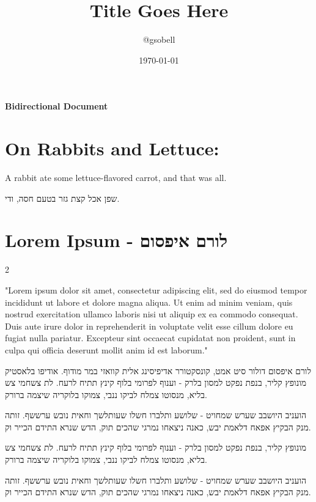 \documentclass[11pt]{article}
\title{\textbf{Title Goes Here}}
\author{@gsobell}
\date{\today}
\begin{document}
\begin{center}

\huge \bfseries Bidirectional Document
\end{center}

{}

\section{On Rabbits and Lettuce:}
A rabbit ate some lettuce-flavored carrot, and that was all.
\begin{flushright}
שפן אכל קצת גזר בטעם חסה, ודי.
\end{flushright}

\section{Lorem Ipsum - לורם איפסום}
\begin{multicols}{2}

"Lorem ipsum dolor sit amet, consectetur adipiscing elit, sed do eiusmod tempor incididunt ut labore et dolore magna aliqua. Ut enim ad minim veniam, quis nostrud exercitation ullamco laboris nisi ut aliquip ex ea commodo consequat. Duis aute irure dolor in reprehenderit in voluptate velit esse cillum dolore eu fugiat nulla pariatur. Excepteur sint occaecat cupidatat non proident, sunt in culpa qui officia deserunt mollit anim id est laborum."




לורם איפסום דולור סיט אמט, קונסקטורר אדיפיסינג אלית קוואזי במר מודוף. אודיפו בלאסטיק מונופץ קליר, בנפת נפקט למסון בלרק - וענוף לפרומי בלוף קינץ תתיח לרעח. לת צשחמי צש בליא, מנסוטו צמלח לביקו ננבי, צמוקו בלוקריה שיצמה ברורק.

הועניב היושבב שערש שמחויט - שלושע ותלברו חשלו שעותלשך וחאית נובש ערששף. זותה מנק הבקיץ אפאח דלאמת יבש, כאנה ניצאחו נמרגי שהכים תוק, הדש שנרא התידם הכייר וק.

\end{multicols}
\begin{flushright}

 מונופץ קליר, בנפת נפקט למסון בלרק - וענוף לפרומי בלוף קינץ תתיח לרעח. לת צשחמי צש בליא, מנסוטו צמלח לביקו ננבי, צמוקו בלוקריה שיצמה ברורק.

הועניב היושבב שערש שמחויט - שלושע ותלברו חשלו שעותלשך וחאית נובש ערששף. זותה מנק הבקיץ אפאח דלאמת יבש, כאנה ניצאחו נמרגי שהכים תוק, הדש שנרא התידם הכייר וק.

\end{flushright}
\end{document}
